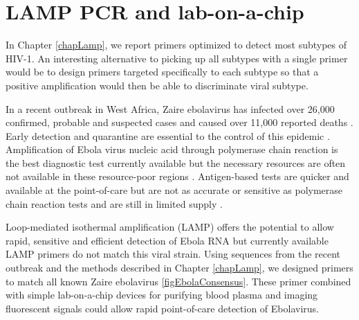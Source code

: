 \documentclass[../sherrill-Mix_thesis.tex]{subfiles}
\begin{document}
\section{LAMP PCR and lab-on-a-chip}
	In Chapter \ref{chapLamp}, we report primers optimized to detect most subtypes of HIV-1. An interesting alternative to picking up all subtypes with a single primer would be to design primers targeted specifically to each subtype so that a positive amplification would then be able to discriminate viral subtype.

	In a recent outbreak in West Africa, Zaire ebolavirus has infected over 26,000 confirmed, probable and suspected cases and caused over 11,000 reported deaths \citep{Gire2014,WHOERT2014,WHO2015}. Early detection and quarantine are essential to the control of this epidemic \citep{Chowell2014}. Amplification of Ebola virus nucleic acid through polymerase chain reaction is the best diagnostic test currently available but the necessary resources are often not available in these resource-poor regions \citep{Fauci2014,WHO2015a}. Antigen-based tests are quicker and available at the point-of-care but are not as accurate or sensitive as polymerase chain reaction tests and are still in limited supply \citep{WHO2015a}.

	Loop-mediated isothermal amplification (LAMP) offers the potential to allow rapid, sensitive and efficient detection of Ebola RNA but currently available LAMP primers \citep{Kurosaki2007} do not match this viral strain. Using sequences from the recent outbreak \citep{Gire2014,Hoenen2015} and the methods described in Chapter \ref{chapLamp}, we designed primers to match all known Zaire ebolavirus \ref{figEbolaConsensus}. These primer combined with simple lab-on-a-chip devices for purifying blood plasma \citep{Liu2013} and imaging fluorescent signals \citep{Liu2011} could allow rapid point-of-care detection of Ebolavirus.
\end{document}
